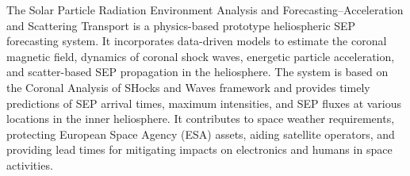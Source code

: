 The Solar Particle Radiation Environment Analysis and Forecasting–Acceleration and Scattering Transport \citep[SPREAdFAST]{kozarev_2022} is a physics-based prototype heliospheric SEP forecasting system. It incorporates data-driven models to estimate the coronal magnetic field, dynamics of coronal shock waves, energetic particle acceleration, and scatter-based SEP propagation in the heliosphere. The system is based on the Coronal Analysis of SHocks and Waves framework \citep[CASHeW]{kozarev_2017} and provides timely predictions of SEP arrival times, maximum intensities, and SEP fluxes at various locations in the inner heliosphere. It contributes to space weather requirements, protecting European Space Agency (ESA) assets, aiding satellite operators, and providing lead times for mitigating impacts on electronics and humans in space activities.




